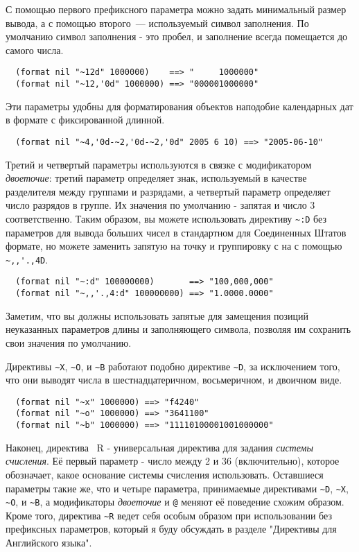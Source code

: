 {С помощью первого префиксного параметра можно задать минимальный размер вывода, а с
помощью второго~--- используемый символ заполнения. По умолчанию символ заполнения - это
пробел, и заполнение всегда помещается до самого числа.

\begin{verbatim}
  (format nil "~12d" 1000000)    ==> "     1000000"
  (format nil "~12,'0d" 1000000) ==> "000001000000"
\end{verbatim}

Эти параметры удобны для форматирования объектов наподобие календарных дат в формате с
фиксированной длинной.

\begin{verbatim}
  (format nil "~4,'0d-~2,'0d-~2,'0d" 2005 6 10) ==> "2005-06-10"
\end{verbatim}

Третий и четвертый параметры используются в связке с модификатором \textit{двоеточие}:
третий параметр определяет знак, используемый в качестве разделителя между группами и
разрядами, а четвертый параметр определяет число разрядов в группе. Их значения по
умолчанию - запятая и число 3 соответственно. Таким образом, вы можете использовать
директиву \lstinline!~:D! без параметров для вывода больших чисел в стандартном для
Соединенных Штатов формате, но можете заменить запятую на точку и группировку с 
на  с помощью \lstinline!~,,'.,4D!.

\begin{verbatim}
  (format nil "~:d" 100000000)       ==> "100,000,000"
  (format nil "~,,'.,4:d" 100000000) ==> "1.0000.0000"
\end{verbatim}

Заметим, что вы должны использовать запятые для замещения позиций неуказанных параметров
длины и заполняющего символа, позволяя им сохранить свои значения по умолчанию.

Директивы \lstinline!~X!, \lstinline!~O!, и \lstinline!~B! работают подобно директиве
\lstinline!~D!, за исключением того, что они выводят числа в шестнадцатеричном,
восьмеричном, и двоичном виде.

\begin{verbatim}
  (format nil "~x" 1000000) ==> "f4240"
  (format nil "~o" 1000000) ==> "3641100"
  (format nil "~b" 1000000) ==> "11110100001001000000"
\end{verbatim}

Наконец, директива ~R - универсальная директива для задания \textit{системы счисления}. Её
первый параметр - число между 2 и 36 (включительно), которое обозначает, какое основание
системы счисления использовать. Оставшиеся параметры такие же, что и четыре параметра,
принимаемые директивами \lstinline!~D!, \lstinline!~X!, \lstinline!~O!, и \lstinline!~B!,
а модификаторы \textit{двоеточие} и \lstinline!@! меняют её поведение схожим
образом. Кроме того, директива \lstinline!~R! ведет себя особым образом при использовании
без префиксных параметров, который я буду обсуждать в разделе "Директивы для Английского
языка".

}
